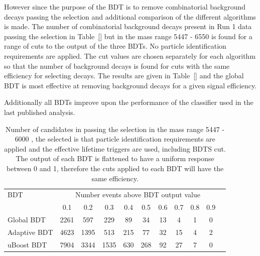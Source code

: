 However since the purpose of the BDT is to remove combinatorial background decays passing the \bsmumu selection and additional comparison of the different algorithms is made. The number of combinatorial background decays present in Run 1 data passing the \bsmumu selection in Table~\ref{} but in the mass range 5447 - 6550 \mevcc is found for a range of cuts to the output of the three BDTs. No particle identification requirements are applied. The cut values are chosen separately for each algorithm so that the number of background decays is found for cuts with the same efficiency for selecting \bsmumu decays. The results are given in Table~\ref{} and the global BDT is most effective at removing background decays for a given signal efficiency.

Additionally all BDTs improve upon the performance of the classifier used in the last published analysis. 




\begin{table}[htbp]
\begin{center}
\begin{tabular}{l|cccccccccc}
\hline
BDT & \multicolumn{9}{c}{Number events above BDT output value}  \\
   & 0.1 & 0.2 & 0.3 & 0.4 & 0.5 & 0.6 & 0.7 & 0.8 & 0.9 \\
Global BDT  & 2261 & 597 & 229 & 89 & 34 & 13 & 4 & 1 & 0 \\ 
Adaptive BDT  & 4623 & 1395 & 513 & 215 & 77 & 32 & 15 & 4 & 2 \\
uBoost BDT & 7904 & 3344 & 1535 &630 & 268 & 92 & 27 & 7 & 0 \\
\hline
\end{tabular}
\vspace{0.7cm}
\vspace{0.7cm}
\caption{Number of candidates in passing the \bsmumu selection in the mass range 5447 - 6000 \mevcc, the selected is that particle identification requirements are applied and the effective lifetime triggers are used, including BDTS cut. The output of each BDT is flattened to have a uniform response between 0 and 1, therefore the cuts applied to each BDT will have the same efficiency.}
\label{tab:bkgdsC}
\end{center}
\vspace{-1.0cm}
\end{table}


